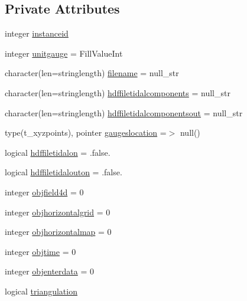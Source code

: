 \subsection*{Private Attributes}
\begin{DoxyCompactItemize}
\item 
integer \mbox{\hyperlink{structmodulegauge_1_1t__gauge_a670e4503a99166efcf32f71146b98dd0}{instanceid}}
\item 
integer \mbox{\hyperlink{structmodulegauge_1_1t__gauge_a5125cc73f1ef8baee4c821630cb097ff}{unitgauge}} = Fill\+Value\+Int
\item 
character(len=stringlength) \mbox{\hyperlink{structmodulegauge_1_1t__gauge_a5999698053496f6d17a3f9d2f7ffb4e7}{filename}} = null\+\_\+str
\item 
character(len=stringlength) \mbox{\hyperlink{structmodulegauge_1_1t__gauge_a8b96b7dd656d04c53e97a88c22086b0b}{hdffiletidalcomponents}} = null\+\_\+str
\item 
character(len=stringlength) \mbox{\hyperlink{structmodulegauge_1_1t__gauge_a5f869f79ed389915d333ded386a6137d}{hdffiletidalcomponentsout}} = null\+\_\+str
\item 
type(t\+\_\+xyzpoints), pointer \mbox{\hyperlink{structmodulegauge_1_1t__gauge_a13903d5e41b49106c8fb273c3a235077}{gaugeslocation}} =$>$ null()
\item 
logical \mbox{\hyperlink{structmodulegauge_1_1t__gauge_aaea00c3db8ffae02b3b8f357697773f7}{hdffiletidalon}} = .false.
\item 
logical \mbox{\hyperlink{structmodulegauge_1_1t__gauge_aacb071c39a4fb58740f3a2ef9bd27678}{hdffiletidalouton}} = .false.
\item 
integer \mbox{\hyperlink{structmodulegauge_1_1t__gauge_a8941e3d08bcf8041b668cf5e185b7639}{objfield4d}} = 0
\item 
integer \mbox{\hyperlink{structmodulegauge_1_1t__gauge_a6f445149307129ac7cbbd6722a9033ce}{objhorizontalgrid}} = 0
\item 
integer \mbox{\hyperlink{structmodulegauge_1_1t__gauge_a2ec962b5943e47ab4eaab076cf837c2a}{objhorizontalmap}} = 0
\item 
integer \mbox{\hyperlink{structmodulegauge_1_1t__gauge_a290eae79017b740466a8cad5c7f6605b}{objtime}} = 0
\item 
integer \mbox{\hyperlink{structmodulegauge_1_1t__gauge_a415f4724ae672fa632f4eed14987a380}{objenterdata}} = 0
\item 
logical \mbox{\hyperlink{structmodulegauge_1_1t__gauge_afa4f6797151465960ab2639ceb5a21bc}{triangulation}}

\end{DoxyCompactItemize}
